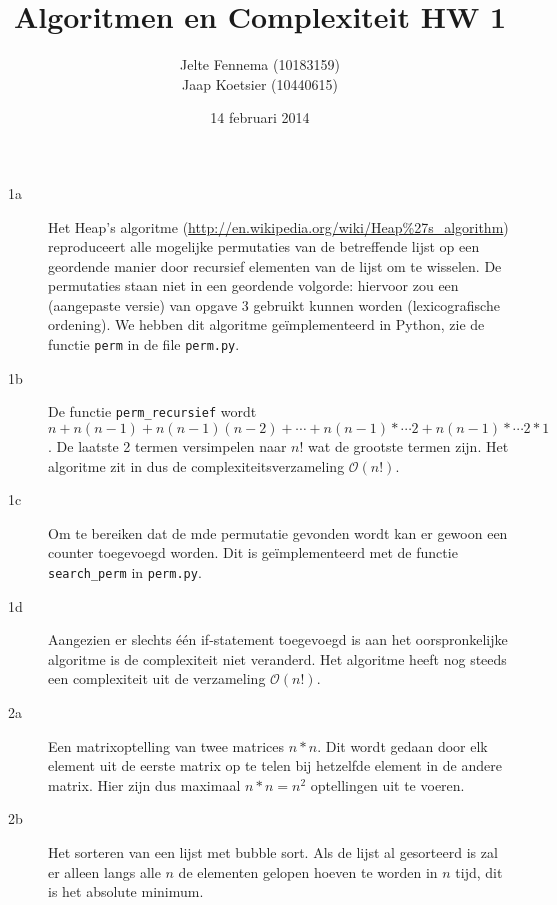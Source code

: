 \documentclass[11pt]{article}
\title{\textbf{Algoritmen en Complexiteit HW 1}}
\author{Jelte Fennema (10183159)\\
		Jaap Koetsier (10440615)}
\date{14 februari 2014}
\newcommand{\bigO}{\ensuremath{\mathcal{O}}}
\begin{document}
\maketitle

\begin{description}
    \item[1a] Het Heap's algoritme
        (\url{http://en.wikipedia.org/wiki/Heap\%27s\_algorithm}) reproduceert
            alle mogelijke permutaties van de betreffende lijst op een geordende
            manier door recursief elementen van de lijst om te wisselen. De
            permutaties staan niet in een geordende volgorde: hiervoor zou een
            (aangepaste versie) van opgave 3 gebruikt kunnen worden
            (lexicografische ordening). We hebben dit algoritme geïmplementeerd
            in Python, zie de functie \texttt{perm} in de file \texttt{perm.py}.

    \item[1b] De functie \texttt{perm\_recursief} wordt
        $n + n(n-1) + n(n-1)(n-2) + \dotsb + n(n-1) * \dotsb 2 + n(n-1)* \dotsb
        2 * 1$.
        De laatste 2 termen versimpelen naar $n! $ wat de grootste termen zijn.
        Het algoritme zit in dus de complexiteitsverzameling \bigO$(n!)$.

    \item[1c] Om te bereiken dat de mde permutatie gevonden wordt kan er gewoon
        een counter toegevoegd worden. Dit is geïmplementeerd met de functie
        \texttt{search\_perm} in \texttt{perm.py}.

    \item[1d] Aangezien er slechts één if-statement toegevoegd is aan het
        oorspronkelijke algoritme is de complexiteit niet veranderd. Het
        algoritme heeft nog steeds een complexiteit uit de verzameling
        \bigO$(n!)$.
        \\


    \item[2a] Een matrixoptelling van twee matrices $n*n$. Dit wordt gedaan door
        elk element uit de eerste matrix op te telen bij hetzelfde element in de
        andere matrix. Hier zijn dus maximaal $n*n = n^2$ optellingen uit te
        voeren.

    \item[2b] Het sorteren van een lijst met bubble sort. Als de lijst al
        gesorteerd is zal er alleen langs alle $n$ de elementen gelopen hoeven
        te worden in $n$ tijd, dit is het absolute minimum.


\end{description}
\end{document}
